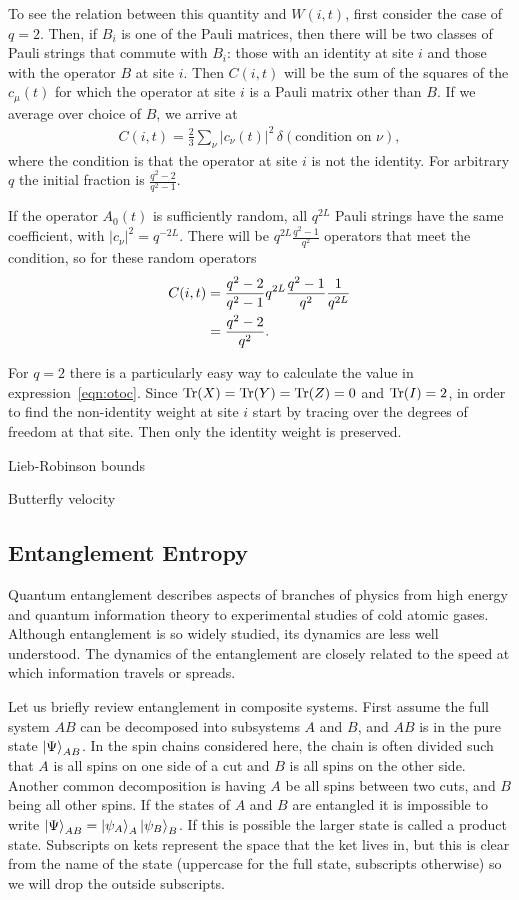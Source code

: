 To see the relation between this quantity and $W(i,t)$, first consider the case of $q=2$. Then, if $B_i$ is one of the Pauli matrices, then there will be two classes of Pauli strings that commute with $B_i$: those with an identity at site $i$ and those with the operator $B$ at site $i$. Then $C(i,t)$ will be the sum of the squares of the $c_\mu(t)$ for which the operator at site $i$ is a Pauli matrix other than $B$. If we average over choice of $B$, we arrive at 
\begin{align}
C(i,t) = \frac{2}{3}\sum_\nu|c_\nu(t)|^2\,\delta(\text{condition on $\nu$}),
	\label{eqn:otoc}
\end{align}
where the condition is that the operator at site $i$ is not the identity. For arbitrary $q$ the initial fraction is $\frac{q^2-2}{q^2-1}$. 

If the operator $A_0(t)$ is sufficiently random, all $q^{2L}$ Pauli strings have the same coefficient, with $|c_\nu|^2 = q^{-2L}$. There will be $q^{2L}\frac{q^2-1}{q^2}$ operators that meet the condition, so for these random operators
\begin{align}
C(i,t) &= \frac{q^2-2}{q^2-1}q^{2L}\frac{q^2-1}{q^2}\frac{1}{q^{2L}}\nonumber\\
&= \frac{q^2-2}{q^2}\nonumber.
\end{align}

For $q=2$ there is a particularly easy way to calculate the value in expression~\ref{eqn:otoc}. Since $\operatorname{Tr}(X) = \operatorname{Tr}(Y)=\operatorname{Tr}(Z) = 0$ and $\operatorname{Tr}(I) = 2$, in order to find the non-identity weight at site $i$ start by tracing over the degrees of freedom at that site. Then only the identity weight is preserved. 

Lieb-Robinson bounds

Butterfly velocity

\subsection{Entanglement Entropy} \label{sub:intro}

Quantum entanglement describes aspects of branches of physics from high energy and quantum information theory to experimental studies of cold atomic gases. Although entanglement is so widely studied, its dynamics are less well understood. The dynamics of the entanglement are closely related to the speed at which information travels or spreads. 

Let us briefly review entanglement in composite systems. First assume the full system $AB$ can be decomposed into subsystems $A$ and $B$, and $AB$ is in the pure state $\left|\Psi\right\rangle_{{AB}}$. In the spin chains considered here, the chain is often divided such that $A$ is all spins on one side of a cut and $B$ is all spins on the other side. Another common decomposition is having $A$ be all spins between two cuts, and $B$ being all other spins. If the states of $A$ and $B$ are entangled it is impossible to write $\left|\Psi\right\rangle_{AB} = \left|\psi_A\right\rangle_A \left|\psi_B\right\rangle_B$. If this is possible the larger state is called a product state. Subscripts on kets represent the space that the ket lives in, but this is clear from the name of the state (uppercase for the full state, subscripts otherwise) so we will drop the outside subscripts.

